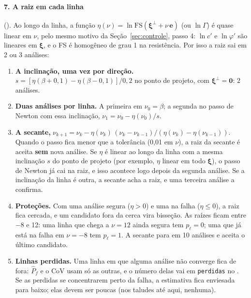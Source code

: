 \documentclass[11pt,a4paper]{article}
\newcommand{\xib}{\bm\xi}
\newcommand{\FS}{\mathrm{FS}}
\begin{document}
\paragraph{7. A raiz em cada linha} (). Ao longo da linha, a função
$\eta(\nu) = \ln\FS(\xib^\perp + \nu\,\bm e)$ (ou $\ln\Gamma$) é quase linear em $\nu$, pelo mesmo motivo da
Seção~\ref{sec:controle}, passo 4: $\ln c'$ e $\ln\varphi'$ são lineares em $\xib$, e o FS é homogêneo de grau 1 na
resistência. Por isso a raiz sai em 2 ou 3 análises:
\begin{enumerate}
  \item \textbf{A inclinação, uma vez por direção.} $s = [\eta(\beta + 0{,}1) - \eta(\beta - 0{,}1)]/0{,}2$ no ponto de
    projeto, com $\xib^\perp = \bm 0$: 2 análises.
  \item \textbf{Duas análises por linha.} A primeira em $\nu_0 = \beta$; a segunda no passo de Newton com essa inclinação,
    $\nu_1 = \nu_0 - \eta(\nu_0)/s$.
  \item \textbf{A secante,} $\nu_{k+1} = \nu_k - \eta(\nu_k)\,(\nu_k - \nu_{k-1})/(\eta(\nu_k) - \eta(\nu_{k-1}))$. Quando o passo
    fica menor que a tolerância (0,01 em $\nu$), a raiz da secante é aceita \textbf{sem} nova análise. Se $\eta$ é linear ao
    longo da linha com a mesma inclinação $s$ do ponto de projeto (por exemplo, $\eta$ linear em todo $\xib$), o passo de
    Newton já cai na raiz, e isso acontece logo depois da segunda análise. Se a inclinação da linha é outra, a secante
    acha a raiz, e uma terceira análise a confirma.
  \item \textbf{Proteções.} Com uma análise segura ($\eta > 0$) e uma na falha ($\eta \le 0$), a raiz fica cercada, e um
    candidato fora da cerca vira bisseção. As raízes ficam entre $-8$ e 12: uma linha que chega a $\nu = 12$ ainda segura
    tem $p_\ell = 0$; uma que já está na falha em $\nu = -8$ tem $p_\ell = 1$. A secante para em 10 análises e aceita o último
    candidato.
  \item \textbf{Linhas perdidas.} Uma linha em que alguma análise não converge fica de fora: $\hat P_f$ e o CoV usam só
    as outras, e o número delas vai em \texttt{perdidas} no . Se as perdidas se concentrarem perto da
    falha, a estimativa fica enviesada para baixo; elas devem ser poucas (nos taludes até aqui, nenhuma).
\end{enumerate}
\end{document}
